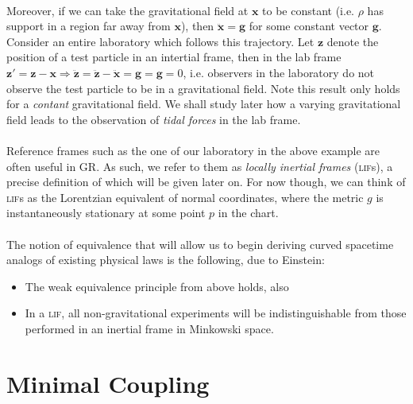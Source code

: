 \documentclass[11pt,fleqn]{report}
\begin{document}
\paragraph{}
Moreover, if we can take the gravitational field at $ \mathbf{x} $ to be constant (i.e. $ \rho $ has support in a region far away from $ \mathbf{x} $), then $ \ddot{\mathbf{x}} = \mathbf{g} $ for some constant vector $ \mathbf{g} $.
Consider an entire laboratory which follows this trajectory. Let $ \mathbf{z} $ denote the position of a test particle in an intertial frame, then in the lab frame $ \mathbf{z}' = \mathbf{z} - \mathbf{x} \Rightarrow \ddot{\mathbf{z}} = \ddot{\mathbf{z}} - \ddot{\mathbf{x}} = \mathbf{g} = \mathbf{g} = 0 $, i.e. observers in the laboratory do not observe the test particle to be in a gravitational field.
Note this result only holds for a \textit{contant} gravitational field. We shall study later how a varying gravitational field leads to the observation of \textsl{tidal forces} in the lab frame.

\paragraph{}
Reference frames such as the one of our laboratory in the above example are often useful in GR.
As such, we refer to them as \textsl{locally inertial frames} (\textsc{lif}s), a precise definition of which will be given later on.
For now though, we can think of \textsc{lif}s as the Lorentzian equivalent of normal coordinates, where the metric $ g $ is instantaneously stationary at some point $ p $ in the chart.

\paragraph{}
The notion of equivalence that will allow us to begin deriving curved spacetime analogs of existing physical laws is the following, due to Einstein:
	\begin{itemize}
		\item The weak equivalence principle from above holds, also
		\item In a \textsc{lif}, all non-gravitational experiments will be indistinguishable from those performed in an inertial frame in Minkowski space.
	\end{itemize}

\section{Minimal Coupling}
\end{document}
